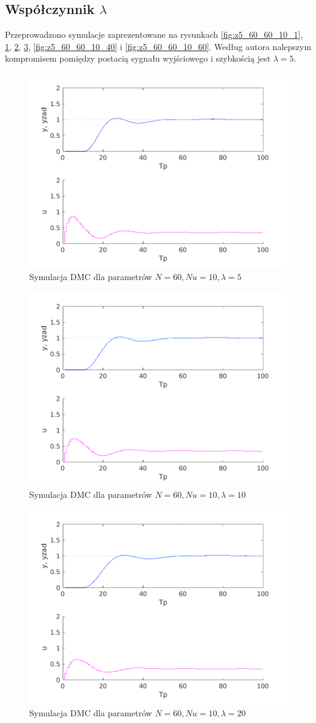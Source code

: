 \documentclass[a4paper, 10pt]{article}
\begin{document}
\subsection{Współczynnik $\lambda$}
Przeprowadzono symulacje zaprezentowane na rysunkach \ref{fig:z5_60_60_10_1}, \ref{fig:z5_60_60_10_5}, \ref{fig:z5_60_60_10_10}, \ref{fig:z5_60_60_10_20}, \ref{fig:z5_60_60_10_40} i \ref{fig:z5_60_60_10_60}. Według autora nalepszym kompromisem pomiędzy postacią sygnału wyjściowego i szybkością jest $\lambda = 5$. 
\begin{figure}
	\centering
	\includegraphics[width=0.7\linewidth]{z5_60_60_10_5.png}
	\caption{Symulacja DMC dla parametrów $N=60, Nu = 10, \lambda = 5$}
	\label{fig:z5_60_60_10_5}
\end{figure}
\begin{figure}
	\centering
	\includegraphics[width=0.7\linewidth]{z5_60_60_10_10.png}
	\caption{Symulacja DMC dla parametrów $N=60, Nu = 10, \lambda = 10$}
	\label{fig:z5_60_60_10_10}
\end{figure}
\begin{figure}
	\centering
	\includegraphics[width=0.7\linewidth]{z5_60_60_10_20.png}
	\caption{Symulacja DMC dla parametrów $N=60, Nu = 10, \lambda = 20$}
	\label{fig:z5_60_60_10_20}
\end{figure}
\end{document}
